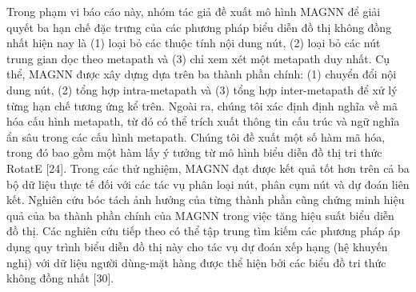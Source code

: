 Trong phạm vi báo cáo này, nhóm tác giả đề xuất mô hình MAGNN để giải quyết ba hạn chế đặc trưng của các phương pháp biểu diễn đồ thị không đồng nhất hiện nay là (1) loại bỏ các thuộc tính nội dung nút, (2) loại bỏ các nút trung gian dọc theo metapath và (3) chỉ xem xét một metapath duy nhất. Cụ thể, MAGNN được xây dựng dựa trên ba thành phần chính: (1) chuyển đổi nội dung nút, (2) tổng hợp intra-metapath và (3) tổng hợp inter-metapath để xử lý từng hạn chế tương ứng kể trên. Ngoài ra, chúng tôi xác định định nghĩa về mã hóa cấu hình metapath, từ đó có thể trích xuất thông tin cấu trúc và ngữ nghĩa ẩn sâu trong các cấu hình metapath. Chúng tôi đề xuất một số hàm mã hóa, trong đó bao gồm một hàm lấy ý tưởng từ mô hình biểu diễn đồ thị tri thức RotatE [24]. Trong các thử nghiệm, MAGNN đạt được kết quả tốt hơn trên cả ba bộ dữ liệu thực tế đối với các tác vụ phân loại nút, phân cụm nút và dự đoán liên kết. Nghiên cứu bóc tách ảnh hưởng của từng thành phần cũng chứng minh hiệu quả của ba thành phần chính của MAGNN trong việc tăng hiệu suất biểu diễn đồ thị. Các nghiên cứu tiếp theo có thể tập trung tìm kiếm các phương pháp áp dụng quy trình biểu diễn đồ thị này cho tác vụ dự đoán xếp hạng (hệ khuyến nghị) với dữ liệu người dùng-mặt hàng được thể hiện bởi các biểu đồ tri thức không đồng nhất [30].
